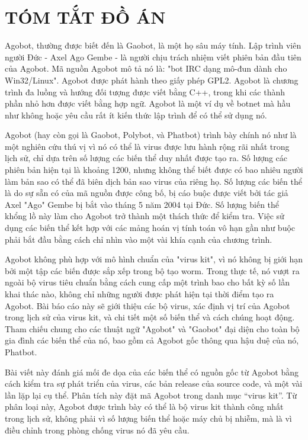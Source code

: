 \chapter*{TÓM TẮT ĐỒ ÁN}

Agobot, thường được biết đến là Gaobot, là một họ sâu máy tính. Lập trình viên
người Đức - Axel Ago Gembe - là người chịu trách nhiệm viết phiên bản đầu tiên của
Agobot. Mã nguồn Agobot mô tả nó là: "bot IRC dạng mô-đun dành cho Win32/Linux".
Agobot được phát hành theo giấy phép GPL2. Agobot là chương trình đa luồng và hướng
đối tượng được viết bằng C++, trong khi các thành phần nhỏ hơn được viết bằng hợp
ngữ. Agobot là một ví dụ về botnet mà hầu như không hoặc yêu cầu rất ít kiến thức lập
trình để có thể sử dụng nó.

Agobot (hay còn gọi là Gaobot, Polybot, và Phatbot) trình bày chính nó như là một
nghiên cứu thú vị vì nó có thể là virus được lưu hành rộng rãi nhất trong lịch sử, chỉ dựa
trên số lượng các biến thể duy nhất được tạo ra. Số lượng các phiên bản hiện tại là
khoảng 1200, nhưng không thể biết được có bao nhiêu người làm bản sao có thể đã biên
dịch bản sao virus của riêng họ. Số lượng các biến thể là do sự sẵn có của mã nguồn được
công bố, bị cáo buộc được viết bởi tác giả Axel "Ago" Gembe bị bắt vào tháng 5 năm
2004 tại Đức. Số lượng biến thể khổng lồ này làm cho Agobot trở thành một thách thức
để kiểm tra. Việc sử dụng các biến thể kết hợp với các mảng hoán vị tính toán vô hạn gần
như buộc phải bắt đầu bằng cách chỉ nhìn vào một vài khía cạnh của chương trình.

Agobot không phù hợp với mô hình chuẩn của "virus kit", vì nó không bị giới hạn
bởi một tập các biến được sắp xếp trong bộ tạo worm. Trong thực tế, nó vượt ra ngoài bộ
virus tiêu chuẩn bằng cách cung cấp một trình bao cho bất kỳ số lần khai thác nào, không
chỉ những người được phát hiện tại thời điểm tạo ra Agobot. Bài báo cáo này sẽ giới thiệu
các bộ virus, xác định vị trí của Agobot trong lịch sử của virus kit, và chi tiết một số biến
thể và cách chúng hoạt động. Tham chiếu chung cho các thuật ngữ "Agobot" và
"Gaobot" đại diện cho toàn bộ gia đình các biến thể của nó, bao gồm cả Agobot gốc
thông qua hậu duệ của nó, Phatbot.

Bài viết này đánh giá mối đe dọa của các biến thể có nguồn gốc từ Agobot bằng cách
kiểm tra sự phát triển của virus, các bản release của source code, và một vài lần lặp lại cụ
thể. Phân tích này đặt mã Agobot trong danh mục “virus kit”. Từ phân loại này, Agobot
được trình bày có thể là bộ virus kit thành công nhất trong lịch sử, không phải vì số lượng
biến thể hoặc máy chủ bị nhiễm, mà là vì điều chỉnh trong phòng chống virus nó đã yêu
cầu.

